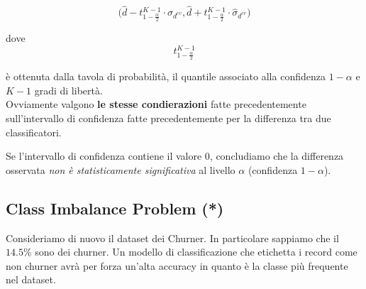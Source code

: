 \[\biggl( \hat{d} - t_{1-\frac{\alpha}{2}}^{K-1} \cdot \hat{\sigma}_{d^{cv}}
,
\hat{d} + t_{1-\frac{\alpha}{2}}^{K-1} \cdot \hat{\sigma}_{d^{cv}} \biggr)\]

dove 
\[t_{1-\frac{\alpha}{2}}^{K-1}\]

è ottenuta dalla tavola di probabilità, il quantile associato alla confidenza $1-\alpha$ e $K-1$ gradi di libertà.\\

Ovviamente valgono \textbf{le stesse condierazioni} fatte precedentemente sull'intervallo di confidenza fatte precedentemente per la differenza tra due classificatori. 

Se l'intervallo di confidenza contiene il valore 0, concludiamo che la differenza osservata \textit{non è statisticamente significativa} al livello $\alpha$ (confidenza $1-\alpha$). 

\subsection{Class Imbalance Problem (*)}
Consideriamo di nuovo il dataset dei Churner. In particolare sappiamo che il $14.5\%$ sono dei churner. Un modello di classificazione che etichetta i record come non churner avrà per forza un'alta accuracy in quanto è la classe più frequente nel dataset. 

